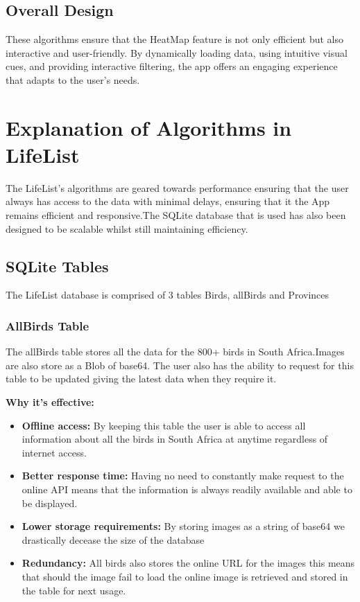 \documentclass[a4paper]{article}
\begin{document}
\subsection{Overall Design}
These algorithms ensure that the HeatMap feature is not only efficient but also interactive and user-friendly. By dynamically loading data, using intuitive visual cues, and providing interactive filtering, the app offers an engaging experience that adapts to the user's needs.

\section{Explanation of Algorithms in LifeList}
The LifeList's algorithms are geared towards performance ensuring that the user always has access to the data with minimal delays, ensuring that it the App remains efficient and responsive.The SQLite database that is used has also been designed to be scalable whilst still maintaining efficiency. 

\subsection{SQLite Tables}
The LifeList database is comprised of 3 tables Birds, allBirds and Provinces

\subsubsection{AllBirds Table}
The allBirds table stores all the data for the 800+ birds in South Africa.Images are also store as a Blob of base64. The user also has the ability to request for this table to be updated giving the latest data when they require it.

\textbf{Why it's effective:}
\begin{itemize}
    \item \textbf{Offline access:} By keeping this table the user is able to access all information about all the birds in South Africa at anytime regardless of internet access.
    \item \textbf{Better response time:} Having no need to constantly make request to the online API means that the information is always readily available and able to be displayed.
    \item \textbf{Lower storage requirements:} By storing images as a string of base64 we drastically decease the size of the database 
    \item \textbf{Redundancy:} All birds also stores the online URL for the images this means that should the image fail to load the online image is retrieved and stored in the table for next usage.
\end{itemize}
\end{document}
